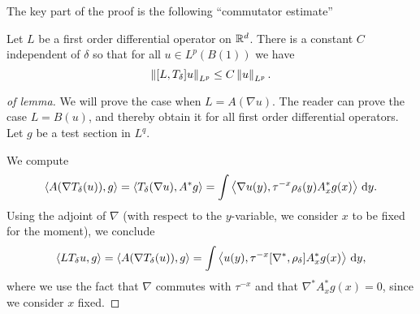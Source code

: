 The key part of the proof is the following ``commutator estimate''
\begin{lemma}
  Let $L$ be a first order differential operator on $\mathbb{R}^{d}$. There is
  a constant $C$ independent of $\delta$ so that for all $u\in L^{p}(B(1))$ we have
  \begin{equation*}
    \left\lVert[L,T_{\delta}]u\right\rVert_{L^{p}}\le C\left\lVert u\right\rVert_{L^{p}}.
  \end{equation*}
\end{lemma}
\begin{proof}[of lemma]
    We will prove the case when $L=A(\nabla u)$. The reader can prove
    the case $L=B(u)$, and thereby obtain it for all first order
    differential operators. Let $g$ be a test section in $L^{q}$.

    We compute
    \begin{equation*}
      \left\langle A(\nabla T_{\delta}(u)),g\right\rangle=\left\langle T_{\delta}(\nabla
        u),A^{*}g\right\rangle=\int \left\langle\nabla u(y), \tau^{-x}\rho_{\delta}(y)A^{*}_{x}g(x)\right\rangle\,\mathrm{d} y.
    \end{equation*}
    Using the adjoint of $\nabla$ (with respect to the $y$-variable,
    we consider $x$ to be fixed for the moment), we conclude
    \begin{equation*}
     \left\langle LT_{\delta}u,g\right\rangle=\left\langle A(\nabla T_{\delta}(u)),g\right\rangle=\int \left\langle u(y), \tau^{-x}[\nabla^{*},\rho_{\delta}]A^{*}_{x}g(x)\right\rangle\,\mathrm{d} y,
   \end{equation*}
   where we use the fact that $\nabla$ commutes with $\tau^{-x}$ and
   that $\nabla^{*}A^{*}_{x}g(x)=0$, since we consider $x$ fixed.


\end{proof}
